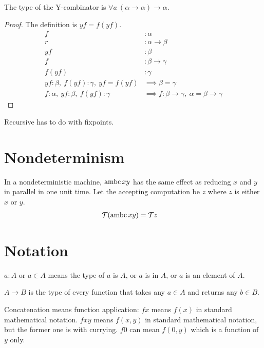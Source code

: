 \begin{mlem}
    The type of the Y-combinator is $\forall a ~ (\alpha \to \alpha) \to \alpha$.
    \begin{proof}
        The definition is $yf = f(yf)$.
        \begin{align}
            f &: \alpha
            \\
            r &: \alpha \to \beta
            \\
            yf &: \beta
            \\
            f &: \beta \to \gamma
            \\
            f(yf) &: \gamma
            \\
            yf : \beta, \ f(yf) : \gamma, \ yf = f(yf) &\implies \beta = \gamma
            \\
            f : \alpha, \ yf : \beta, \ f(yf) : \gamma &\implies f : \beta \to \gamma, \ \alpha = \beta \to \gamma
        \end{align}
    \end{proof}
\end{mlem}

Recursive has to do with fixpoints.

\section{Nondeterminism}

In a nondeterministic machine, $\operatorname{ambc} x y$
has the same effect as reducing $x$ and $y$ in parallel in one unit time.
Let the accepting computation be $z$ where $z$ is either $x$ or $y$.
\begin{align}
    \mathcal{T}(\operatorname{ambc} xy) &= \mathcal{T} z
\end{align}

\section{Notation}

$a : A$ or $a \in A$ means the type of $a$ is $A$,
or $a$ is in $A$,
or $a$ is an element of $A$.

$A \to B$ is the type of every function
that takes any $a \in A$ and returns any $b \in B$.

Concatenation means function application:
$fx$ means $f(x)$ in standard mathematical notation.
$fxy$ means $f(x,y)$ in standard mathematical notation,
but the former one is with currying.
$f0$ can mean $f(0,y)$ which is a function of $y$ only.

